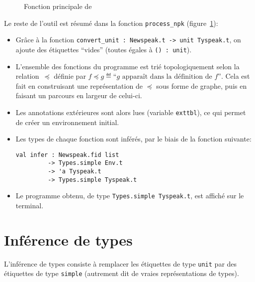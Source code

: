 \begin{figure}
\caption{Fonction principale de \ptrtype{}}
\label{fig:implem-process}
\end{figure}

Le reste de l'outil est résumé dans la fonction
\texttt{process\_npk} (figure~\ref{fig:implem-process}):

\begin{itemize}

\item Grâce à la fonction \verb!convert_unit : Newspeak.t -> unit Tyspeak.t!,
  on ajoute des étiquettes ``vides'' (toutes égales à \verb!() : unit!).

\item L'ensemble des fonctions du programme est trié topologiquement selon la
  relation~$\preceq$ définie par $f \preceq g \eqdef \textrm{``} g
  \textrm{ apparaît dans la définition de } f \textrm{''}$. Cela est fait en
  construisant une représentation de $\preceq$ sous forme de graphe, puis en
  faisant un parcours en largeur de celui-ci.


\item Les annotations extérieures sont alors lues (variable \texttt{exttbl}), ce
  qui permet de créer un environnement initial.

\item Les types de chaque fonction sont inférés, par le biais de la fonction
  suivante:

\begin{Verbatim}
val infer : Newspeak.fid list
         -> Types.simple Env.t
         -> 'a Tyspeak.t
         -> Types.simple Tyspeak.t
\end{Verbatim}

\item Le programme obtenu, de type \texttt{Types.simple Tyspeak.t}, est affiché
  sur le terminal.

\end{itemize}

\section{Inférence de types}

L'inférence de types consiste à remplacer les étiquettes de type \texttt{unit}
par des étiquettes de type \texttt{simple} (autrement dit de vraies
représentations de types).

